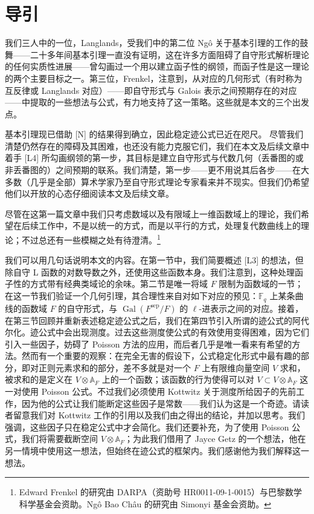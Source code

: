\section*{导引}

我们三人中的一位，Langlands，受我们中的第二位 Ngô 关于基本引理的工作的鼓舞——二十多年间基本引理一直没有证明，这在许多方面阻碍了自守形式解析理论的任何实质性进展——曾勾画过一个用以建立函子性的纲领，而函子性是这一理论的两个主要目标之一。第三位，Frenkel，注意到，从对应的几何形式（有时称为互反律或 Langlands 对应）——即自守形式与 Galois 表示之间预期存在的对应——中提取的一些想法与公式，有力地支持了这一策略。这些就是本文的三个出发点。

基本引理现已借助 [N] 的结果得到确立，因此稳定迹公式已近在咫尺。
尽管我们清楚仍然存在的障碍及其困难，也还没有能力克服它们，我们在本文及后续文章中着手 [L4] 所勾画纲领的第一步，其目标是建立自守形式与代数几何（丢番图的或非丢番图的）之间预期的联系。我们清楚，第一步——更不用说其后各步——在大多数（几乎是全部）算术学家乃至自守形式理论专家看来并不现实。但我们仍希望他们以开放的心态仔细阅读本文及后续文章。

尽管在这第一篇文章中我们只考虑数域以及有限域上一维函数域上的理论，我们希望在后续工作中，不是以统一的方式，而是以平行的方式，处理复代数曲线上的理论；不过总还有一些模糊之处有待澄清。\footnote{Edward Frenkel 的研究由 DARPA（资助号 HR0011-09-1-0015）与巴黎数学科学基金会资助。Ngô Bao Châu 的研究由 Simonyi 基金会资助。}

我们可以用几句话说明本文的内容。在第一节中，我们简要概述 [L3] 的想法，但除自守 L 函数的对数导数之外，还使用这些函数本身。我们注意到，这种处理函子性的方式带有经典类域论的余味。第二节是唯一将域 $F$ 限制为函数域的一节；在这一节我们验证一个几何引理，其合理性来自对如下对应的预见：$\mathbb{F}_q$ 上某条曲线的函数域 $F$ 的自守形式，与 $\operatorname{Gal}(F^{\mathrm{sep}}/F)$ 的 $\ell$-进表示之间的对应。接着，在第三节回顾并重新表述稳定迹公式之后，我们在第四节引入所谓的迹公式的阿代尔化。迹公式中会出现测度。过去这些测度使公式的有效使用变得困难，因为它们引入一些因子，妨碍了 Poisson 方法的应用，而后者几乎是唯一看来有希望的方法。然而有一个重要的观察：在完全无害的假设下，公式稳定化形式中最有趣的部分，即对正则元素求和的部分，差不多就是对一个 $F$ 上有限维向量空间 $V$ 求和，被求和的是定义在 $V\otimes\mathbb{A}_F$ 上的一个函数；该函数的行为使得可以对 $V\subset V\otimes\mathbb{A}_F$ 这一对使用 Poisson 公式。不过我们必须使用 Kottwitz 关于测度所给因子的先前工作，因为他的公式让我们能断定这些因子是常数——我们认为这是一个奇迹。请读者留意我们对 Kottwitz 工作的引用以及我们由之得出的结论，并加以思考。我们强调，这些因子只在稳定公式中才会简化。我们还要补充，为了使用 Poisson 公式，我们将需要截断空间 $V\otimes\mathbb{A}_F$；为此我们借用了 Jayce Getz 的一个想法，他在另一情境中使用这一想法，但始终在迹公式的框架内。我们感谢他为我们解释这一想法。

